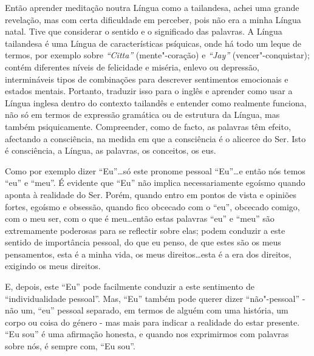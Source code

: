 Então aprender meditação noutra Língua como a tailandesa, achei uma
grande revelação, mas com certa dificuldade em perceber, pois não era a
minha Língua natal. Tive que considerar o sentido e o significado das
palavras. A Língua tailandesa é uma Língua de características psíquicas,
onde há todo um leque de termos, por exemplo sobre \emph{``Citta''}
(mente"-coração) e \emph{``Jay''} (vencer"-conquistar); contém diferentes
níveis de felicidade e miséria, enlevo ou depressão, intermináveis tipos
de combinações para descrever sentimentos emocionais e estados mentais.
Portanto, traduzir isso para o inglês e aprender como usar a Língua
inglesa dentro do contexto tailandês e entender como realmente funciona,
não só em termos de expressão gramática ou de estrutura da Língua, mas
também psiquicamente. Compreender, como de facto, as palavras têm
efeito, afectando a consciência, na medida em que a consciência é o
alicerce do Ser. Isto é consciência, a Língua, as palavras, os
conceitos, os eus.

Como por exemplo dizer ``Eu''\ldots{}só este pronome pessoal ``Eu''\ldots{}e então
nós temos ``eu'' e ``meu''. É evidente que ``Eu'' não implica
necessariamente egoísmo quando aponta à realidade do Ser. Porém, quando
entro em pontos de vista e opiniões fortes, egoísmo e obsessão, quando
fico obcecado com o ``eu'', obcecado comigo, com o meu ser, com o que é
meu\ldots{}então estas palavras ``eu'' e ``meu'' são extremamente poderosas
para se reflectir sobre elas; podem conduzir a este sentido de
importância pessoal, do que eu penso, de que estes são os meus
pensamentos, esta é a minha vida, os meus direitos\ldots{}esta é a era dos
direitos, exigindo os meus direitos.

E, depois, este ``Eu'' pode facilmente conduzir a este sentimento de
``individualidade pessoal''. Mas, ``Eu'' também pode querer dizer
``não"-pessoal'' - não um, ``eu'' pessoal separado, em termos de alguém
com uma história, um corpo ou coisa do género - mas mais para indicar a
realidade do estar presente. ``Eu sou'' é uma afirmação honesta, e
quando nos exprimirmos com palavras sobre nós, é sempre com, ``Eu sou''.

